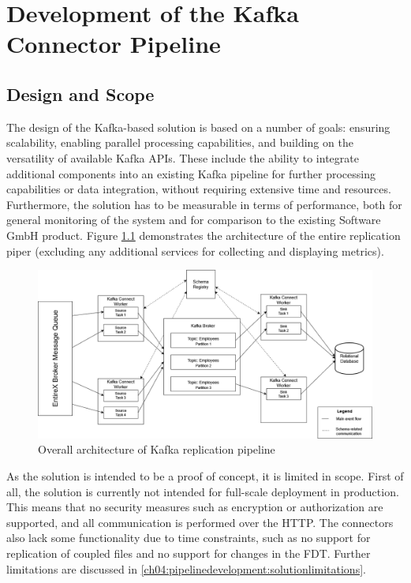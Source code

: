 \chapter{Development of the Kafka Connector Pipeline}
\label{ch04:pipelinedevelopment}

\section{Design and Scope}
The design of the Kafka-based solution is based on a number of goals: ensuring scalability, enabling parallel processing capabilities, and building on the versatility of available Kafka \ac{APIs}. These include the ability to integrate additional components into an existing Kafka pipeline for further processing capabilities or data integration, without requiring extensive time and resources. Furthermore, the solution has to be measurable in terms of performance, both for general monitoring of the system and for comparison to the existing Software GmbH product. Figure \ref{fig:chapter04:overallarchitecture} demonstrates the architecture of the entire replication piper (excluding any additional services for collecting and displaying metrics).

\begin{figure}[htbp]
 \centering
 \includegraphics[width=1\textwidth]{chapters/images/kafka pipeline overall architecture enlarged.drawio.png}
 \caption{Overall architecture of Kafka replication pipeline}
 \label{fig:chapter04:overallarchitecture}
\end{figure}

As the solution is intended to be a proof of concept, it is limited in scope. First of all, the solution is currently not intended for full-scale deployment in production. This means that no security measures such as encryption or authorization are supported, and all communication is performed over the \ac{HTTP}. The connectors also lack some functionality due to time constraints, such as no support for replication of coupled files and no support for changes in the \ac{FDT}. Further limitations are discussed in \ref{ch04:pipelinedevelopment:solutionlimitations}.

